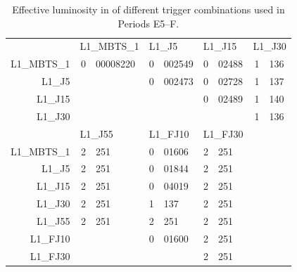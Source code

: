 \begin{table}
\begin{center}
  \begin{tabular}{ r r@{.}l r@{.}l r@{.}l r@{.}l }
                & \multicolumn{2}{l}{L1\_MBTS\_1} & \multicolumn{2}{l}{L1\_J5}   & \multicolumn{2}{l}{L1\_J15}  & \multicolumn{2}{l}{L1\_J30} \\
    \cmidrule{2-9}
    L1\_MBTS\_1 & 0&00008220                      & 0&002549                     & 0&02488                      & 1&136                       \\
    L1\_J5      & \multicolumn{2}{l}{}            & 0&002473                     & 0&02728                      & 1&137                       \\
    L1\_J15     & \multicolumn{2}{l}{}            & \multicolumn{2}{l}{}         & 0&02489                      & 1&140                       \\
    L1\_J30     & \multicolumn{2}{l}{}            & \multicolumn{2}{l}{}         & \multicolumn{2}{l}{}         & 1&136                       \\
                & \multicolumn{2}{l}{L1\_J55}     & \multicolumn{2}{l}{L1\_FJ10} & \multicolumn{2}{l}{L1\_FJ30} & \multicolumn{2}{l}{}        \\
    \cmidrule{2-9}
    L1\_MBTS\_1 & 2&251                           & 0&01606                      & 2&251                        & \multicolumn{2}{l}{}        \\
    L1\_J5      & 2&251                           & 0&01844                      & 2&251                        & \multicolumn{2}{l}{}        \\
    L1\_J15     & 2&251                           & 0&04019                      & 2&251                        & \multicolumn{2}{l}{}        \\
    L1\_J30     & 2&251                           & 1&137                        & 2&251                        & \multicolumn{2}{l}{}        \\
    L1\_J55     & 2&251                           & 2&251                        & 2&251                        & \multicolumn{2}{l}{}        \\
    L1\_FJ10    & \multicolumn{2}{l}{}            & 0&01600                      & 2&251                        & \multicolumn{2}{l}{}        \\
    L1\_FJ30    & \multicolumn{2}{l}{}            & \multicolumn{2}{l}{}         & 2&251                        & \multicolumn{2}{l}{}        \\
  \end{tabular}
  \caption{Effective luminosity in \ipb of different trigger combinations used in
           Periods E5--F.}
  \label{tab:dijets:LumiDijetPeriodE5F}
\end{center}
\end{table}

